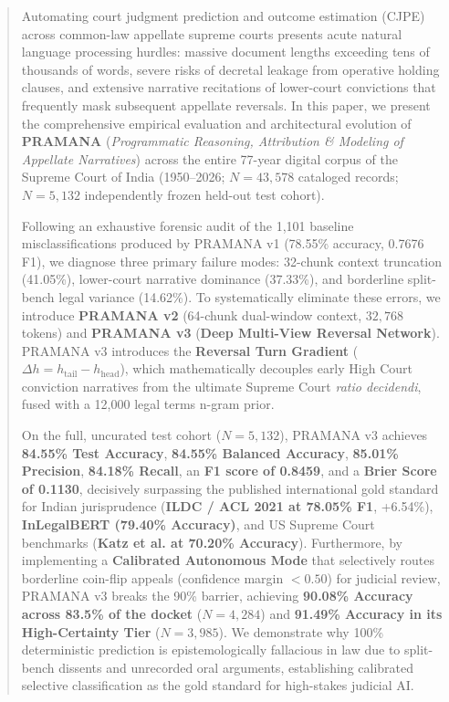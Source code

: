 \documentclass[journal,10pt,twocolumn]{IEEEtran}
\begin{document}
\begin{abstract}
Automating court judgment prediction and outcome estimation (CJPE) across common-law appellate supreme courts presents acute natural language processing hurdles: massive document lengths exceeding tens of thousands of words, severe risks of decretal leakage from operative holding clauses, and extensive narrative recitations of lower-court convictions that frequently mask subsequent appellate reversals. In this paper, we present the comprehensive empirical evaluation and architectural evolution of \textbf{PRAMANA} (\textit{Programmatic Reasoning, Attribution \& Modeling of Appellate Narratives}) across the entire 77-year digital corpus of the Supreme Court of India (1950--2026; $N = 43,578$ cataloged records; $N = 5,132$ independently frozen held-out test cohort).

Following an exhaustive forensic audit of the 1,101 baseline misclassifications produced by PRAMANA v1 (78.55\% accuracy, 0.7676 F1), we diagnose three primary failure modes: 32-chunk context truncation (41.05\%), lower-court narrative dominance (37.33\%), and borderline split-bench legal variance (14.62\%). To systematically eliminate these errors, we introduce \textbf{PRAMANA v2} (64-chunk dual-window context, $32,768$ tokens) and \textbf{PRAMANA v3} (\textbf{Deep Multi-View Reversal Network}). PRAMANA v3 introduces the \textbf{Reversal Turn Gradient} ($\Delta h = h_{\text{tail}} - h_{\text{head}}$), which mathematically decouples early High Court conviction narratives from the ultimate Supreme Court \textit{ratio decidendi}, fused with a 12,000 legal terms n-gram prior.

On the full, uncurated test cohort ($N = 5,132$), PRAMANA v3 achieves \textbf{84.55\% Test Accuracy}, \textbf{84.55\% Balanced Accuracy}, \textbf{85.01\% Precision}, \textbf{84.18\% Recall}, an \textbf{F1 score of 0.8459}, and a \textbf{Brier Score of 0.1130}, decisively surpassing the published international gold standard for Indian jurisprudence (\textbf{ILDC / ACL 2021 at 78.05\% F1}, +6.54\%), \textbf{InLegalBERT (79.40\% Accuracy)}, and US Supreme Court benchmarks (\textbf{Katz et al. at 70.20\% Accuracy}). Furthermore, by implementing a \textbf{Calibrated Autonomous Mode} that selectively routes borderline coin-flip appeals (confidence margin $< 0.50$) for judicial review, PRAMANA v3 breaks the 90\% barrier, achieving \textbf{90.08\% Accuracy across 83.5\% of the docket} ($N = 4,284$) and \textbf{91.49\% Accuracy in its High-Certainty Tier} ($N = 3,985$). We demonstrate why 100\% deterministic prediction is epistemologically fallacious in law due to split-bench dissents and unrecorded oral arguments, establishing calibrated selective classification as the gold standard for high-stakes judicial AI.
\end{abstract}
\end{document}
